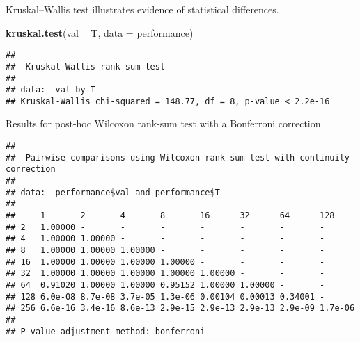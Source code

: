 \documentclass[]{book}
\newenvironment{Shaded}{\begin{snugshade}}{\end{snugshade}}
\newcommand{\DataTypeTok}[1]{\textcolor[rgb]{0.13,0.29,0.53}{#1}}
\newcommand{\KeywordTok}[1]{\textcolor[rgb]{0.13,0.29,0.53}{\textbf{#1}}}
\newcommand{\NormalTok}[1]{#1}
\newcommand{\OperatorTok}[1]{\textcolor[rgb]{0.81,0.36,0.00}{\textbf{#1}}}
\newcommand{\OtherTok}[1]{\textcolor[rgb]{0.56,0.35,0.01}{#1}}
\newcommand{\StringTok}[1]{\textcolor[rgb]{0.31,0.60,0.02}{#1}}
\begin{document}
Kruskal--Wallis test illustrates evidence of statistical differences.

\begin{Shaded}
\begin{Highlighting}[]
\KeywordTok{kruskal.test}\NormalTok{(val }\OperatorTok{~}\StringTok{ }\NormalTok{T, }\DataTypeTok{data =}\NormalTok{ performance)}
\end{Highlighting}
\end{Shaded}

\begin{verbatim}
## 
##  Kruskal-Wallis rank sum test
## 
## data:  val by T
## Kruskal-Wallis chi-squared = 148.77, df = 8, p-value < 2.2e-16
\end{verbatim}

Results for post-hoc Wilcoxon rank-sum test with a Bonferroni correction.

\begin{Shaded}
\end{Shaded}

\begin{verbatim}
## 
##  Pairwise comparisons using Wilcoxon rank sum test with continuity correction 
## 
## data:  performance$val and performance$T 
## 
##     1       2       4       8       16      32      64      128    
## 2   1.00000 -       -       -       -       -       -       -      
## 4   1.00000 1.00000 -       -       -       -       -       -      
## 8   1.00000 1.00000 1.00000 -       -       -       -       -      
## 16  1.00000 1.00000 1.00000 1.00000 -       -       -       -      
## 32  1.00000 1.00000 1.00000 1.00000 1.00000 -       -       -      
## 64  0.91020 1.00000 1.00000 0.95152 1.00000 1.00000 -       -      
## 128 6.0e-08 8.7e-08 3.7e-05 1.3e-06 0.00104 0.00013 0.34001 -      
## 256 6.6e-16 3.4e-16 8.6e-13 2.9e-15 2.9e-13 2.9e-13 2.9e-09 1.7e-06
## 
## P value adjustment method: bonferroni
\end{verbatim}
\end{document}
